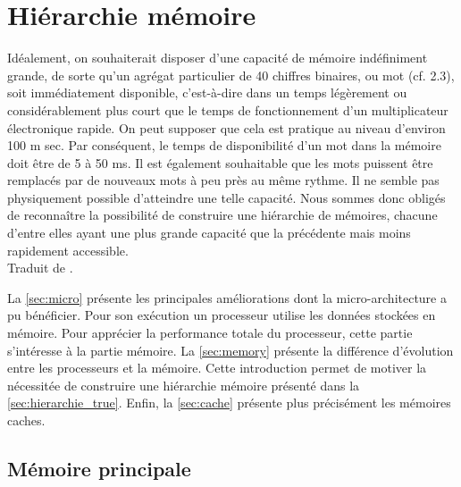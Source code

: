 \section{Hiérarchie mémoire} \label{sec:hierarchie}

\begin{fancyquotes}
Idéalement, on souhaiterait disposer d'une capacité de mémoire indéfiniment grande, de sorte qu'un agrégat particulier de 40 chiffres binaires, ou mot (cf. 2.3), soit immédiatement disponible, c'est-à-dire dans un temps légèrement ou considérablement plus court que le temps de fonctionnement d'un multiplicateur électronique rapide. On peut supposer que cela est pratique au niveau d'environ 100 m sec. Par conséquent, le temps de disponibilité d'un mot dans la mémoire doit être de 5 à 50 ms. Il est également souhaitable que les mots puissent être remplacés par de nouveaux mots à peu près au même rythme. Il ne semble pas physiquement possible d'atteindre une telle capacité. Nous sommes donc obligés de reconnaître la possibilité de construire une hiérarchie de mémoires, chacune d'entre elles ayant une plus grande capacité que la précédente mais moins rapidement accessible.\\
Traduit de \cite{burks1946preliminary}.

\end{fancyquotes}

La \autoref{sec:micro} présente les principales améliorations dont la micro-architecture a pu  bénéficier. Pour son exécution un processeur utilise les données stockées en mémoire. Pour apprécier la performance totale du processeur, cette partie s'intéresse à la partie mémoire. 
La \autoref{sec:memory} présente la différence d'évolution entre les processeurs et la mémoire. Cette introduction permet de motiver la nécessitée de construire une hiérarchie mémoire présenté dans la \autoref{sec:hierarchie_true}. Enfin, la \autoref{sec:cache} présente plus précisément les mémoires caches.







\subsection{Mémoire principale} \label{sec:memory}

